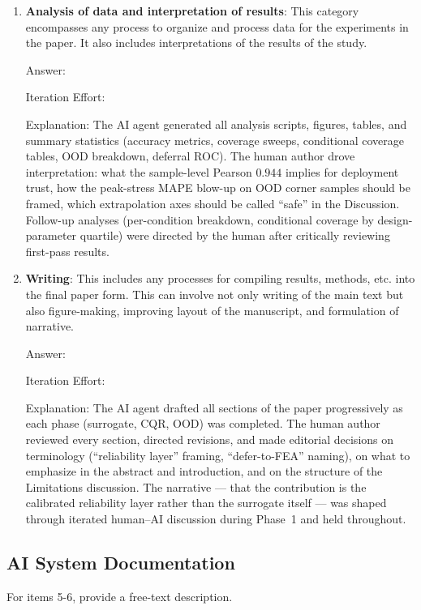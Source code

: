 \documentclass{article}
\begin{document}
\begin{enumerate}
    \item \textbf{Analysis of data and interpretation of results}: This category encompasses any process to organize and process data for the experiments in the paper. It also includes interpretations of the results of the study.

    Answer: \involvementB{}

    Iteration Effort: \iterationMedium{}

    Explanation: The AI agent generated all analysis scripts, figures, tables, and summary statistics (accuracy metrics, coverage sweeps, conditional coverage tables, OOD breakdown, deferral ROC). The human author drove interpretation: what the sample-level Pearson $0.944$ implies for deployment trust, how the peak-stress MAPE blow-up on OOD corner samples should be framed, which extrapolation axes should be called ``safe'' in the Discussion. Follow-up analyses (per-condition breakdown, conditional coverage by design-parameter quartile) were directed by the human after critically reviewing first-pass results.

    \item \textbf{Writing}: This includes any processes for compiling results, methods, etc. into the final paper form. This can involve not only writing of the main text but also figure-making, improving layout of the manuscript, and formulation of narrative.

    Answer: \involvementC{}

    Iteration Effort: \iterationMedium{}

    Explanation: The AI agent drafted all sections of the paper progressively as each phase (surrogate, CQR, OOD) was completed. The human author reviewed every section, directed revisions, and made editorial decisions on terminology (``reliability layer'' framing, ``defer-to-FEA'' naming), on what to emphasize in the abstract and introduction, and on the structure of the Limitations discussion. The narrative --- that the contribution is the calibrated reliability layer rather than the surrogate itself --- was shaped through iterated human--AI discussion during Phase~1 and held throughout.

\end{enumerate}

\subsection*{AI System Documentation}

For items 5-6, provide a free-text description.
\end{document}
